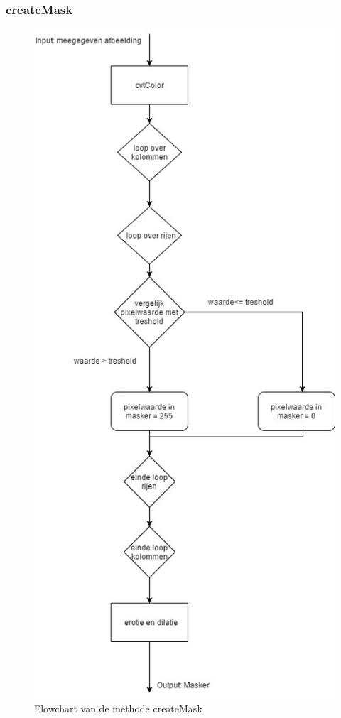 \subsubsection{createMask}
\begin{figure}[hbp]
	\includegraphics[scale=0.45]{FlowShart_createMask}
	\caption{Flowchart van de methode createMask}
	\label{imgFSCMa}
\end{figure}

